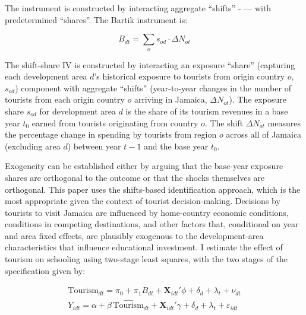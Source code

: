 \documentclass[12pt]{article}
\begin{document}
	
	The instrument is constructed by interacting aggregate ``shifts'' - --- with predetermined ``shares''. The Bartik instrument is:
	
	\begin{equation}
		B_{dt} = \sum_{o} s_{od} \cdot \Delta N_{ot}
	\end{equation}
	


		The shift-share IV is constructed by interacting an exposure ``share” (capturing each development area $d$'s historical exposure to tourists from origin country $o$, $s_{od}$) component with aggregate ``shifts”  (year-to-year changes in the number of tourists from each origin country $o$ arriving in Jamaica, $\Delta N_{ot}$). The exposure share $s_{od}$ for development area $d$ is the share of its tourism revenues in a base year $t_0$ earned from tourists originating from country $o$. The shift  $\Delta N_{ot}$ measures the percentage change in spending by tourists from region $o$ across all of Jamaica (excluding area $d$) between year $t-1$ and the base year $t_0$.
		
		 Exogeneity can be established either by arguing that the base-year exposure shares are orthogonal to the outcome or that the shocks themselves are orthogonal. This paper uses the shifts-based identification approach, which is the most appropriate given the context of tourist decision-making. Decisions by tourists to visit Jamaica are influenced by home-country economic conditions, conditions in competing destinations, and other factors that, conditional on year and area fixed effects, are plausibly exogenous to the development-area characteristics that influence educational investment. I estimate the effect of tourism on schooling using two-stage least squares, with the two stages of the specification given by:

	\begin{gather}
		\text{Tourism}_{dt} = \pi_0 + \pi_1 B_{dt} + \mathbf{X}_{idt}' \phi + \delta_d + \lambda_t + \nu_{dt} \label{eq:first_stage} \\
		Y_{idt} = \alpha + \beta \, \widehat{\text{Tourism}}_{dt} + \mathbf{X}_{idt}' \gamma + \delta_d + \lambda_t + \varepsilon_{idt} \label{eq:second_stage_sys}
	\end{gather}
\end{document}
